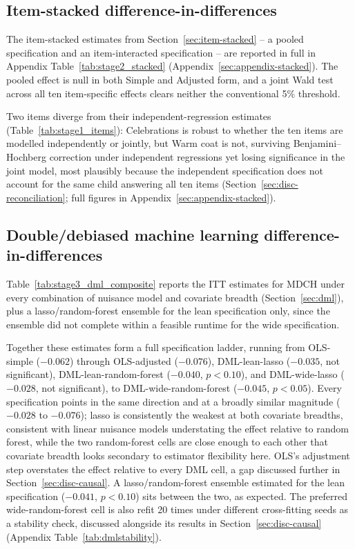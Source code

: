 
 
\subsection{Item-stacked difference-in-differences}
\label{sec:res-stacked}
 
The item-stacked estimates from Section~\ref{sec:item-stacked} -- a pooled specification and an item-interacted specification -- are reported in full in Appendix Table~\ref{tab:stage2_stacked} (Appendix~\ref{sec:appendix-stacked}). The pooled effect is null in both Simple and Adjusted form, and a joint Wald test across all ten item-specific effects clears neither the conventional 5\% threshold.
 
Two items diverge from their independent-regression estimates (Table~\ref{tab:stage1_items}): Celebrations is robust to whether the ten items are modelled independently or jointly, but Warm coat is not, surviving Benjamini--Hochberg correction under independent regressions yet losing significance in the joint model, most plausibly because the independent specification does not account for the same child answering all ten items (Section~\ref{sec:disc-reconciliation}; full figures in Appendix~\ref{sec:appendix-stacked}).
 
\subsection{Double/debiased machine learning difference-in-differences}
\label{sec:res-dml}
 
Table~\ref{tab:stage3_dml_composite} reports the ITT estimates for MDCH under every combination of nuisance model and covariate breadth (Section~\ref{sec:dml}), plus a lasso/random-forest ensemble for the lean specification only, since the ensemble did not complete within a feasible runtime for the wide specification.
 

 
Together these estimates form a full specification ladder, running from OLS-simple ($-0.062$) through OLS-adjusted ($-0.076$), DML-lean-lasso ($-0.035$, not significant), DML-lean-random-forest ($-0.040$, $p<0.10$), and DML-wide-lasso ($-0.028$, not significant), to DML-wide-random-forest ($-0.045$, $p<0.05$). Every specification points in the same direction and at a broadly similar magnitude ($-0.028$ to $-0.076$); lasso is consistently the weakest at both covariate breadths, consistent with linear nuisance models understating the effect relative to random forest, while the two random-forest cells are close enough to each other that covariate breadth looks secondary to estimator flexibility here. OLS's adjustment step overstates the effect relative to every DML cell, a gap discussed further in Section~\ref{sec:disc-causal}. A lasso/random-forest ensemble estimated for the lean specification ($-0.041$, $p<0.10$) sits between the two, as expected. The preferred wide-random-forest cell is also refit 20 times under different cross-fitting seeds as a stability check, discussed alongside its results in Section~\ref{sec:disc-causal} (Appendix Table~\ref{tab:dmlstability}).
 

